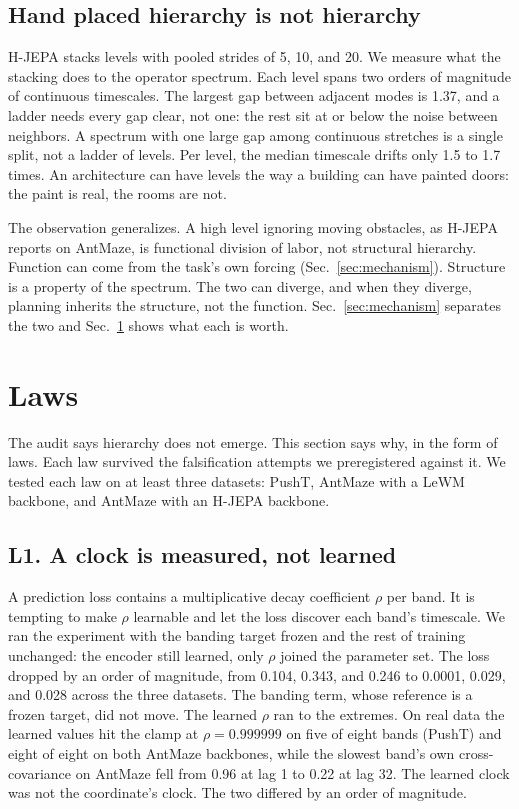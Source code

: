 \documentclass[11pt]{article}
\begin{document}
\subsection{Hand placed hierarchy is not hierarchy}
\label{sec:handplaced}

H-JEPA stacks levels with pooled strides of 5, 10, and 20.
We measure what the stacking does to the operator spectrum.
Each level spans two orders of magnitude of continuous timescales.
The largest gap between adjacent modes is 1.37, and a ladder needs every gap clear, not one: the rest sit at or below the noise between neighbors.
A spectrum with one large gap among continuous stretches is a single split, not a ladder of levels.
Per level, the median timescale drifts only 1.5 to 1.7 times.
An architecture can have levels the way a building can have painted doors: the paint is real, the rooms are not.

The observation generalizes.
A high level ignoring moving obstacles, as H-JEPA reports on AntMaze, is functional division of labor, not structural hierarchy.
Function can come from the task's own forcing (Sec.~\ref{sec:mechanism}).
Structure is a property of the spectrum.
The two can diverge, and when they diverge, planning inherits the structure, not the function.
Sec.~\ref{sec:mechanism} separates the two and Sec.~\ref{sec:laws} shows what each is worth.

\section{Laws}
\label{sec:laws}

The audit says hierarchy does not emerge.
This section says why, in the form of laws.
Each law survived the falsification attempts we preregistered against it.
We tested each law on at least three datasets: PushT, AntMaze with a LeWM backbone, and AntMaze with an H-JEPA backbone.

\subsection{L1. A clock is measured, not learned}
\label{sec:l1}

A prediction loss contains a multiplicative decay coefficient $\rho$ per band.
It is tempting to make $\rho$ learnable and let the loss discover each band's timescale.
We ran the experiment with the banding target frozen and the rest of training unchanged: the encoder still learned, only $\rho$ joined the parameter set.
The loss dropped by an order of magnitude, from 0.104, 0.343, and 0.246 to 0.0001, 0.029, and 0.028 across the three datasets.
The banding term, whose reference is a frozen target, did not move.
The learned $\rho$ ran to the extremes.
On real data the learned values hit the clamp at $\rho = 0.999999$ on five of eight bands (PushT) and eight of eight on both AntMaze backbones, while the slowest band's own cross-covariance on AntMaze fell from 0.96 at lag 1 to 0.22 at lag 32.
The learned clock was not the coordinate's clock.
The two differed by an order of magnitude.
\end{document}

